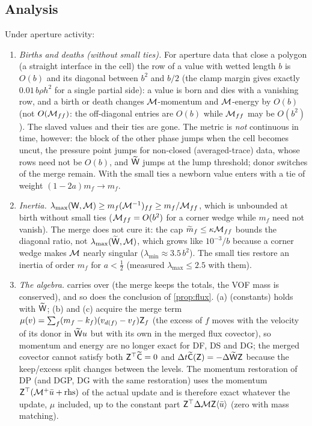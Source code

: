 \subsection{Analysis}\label{sec:ap:analysis}
\begin{proposition}\label{prop:aperture}
Under aperture activity:
\begin{enumerate}[leftmargin=*,itemsep=1pt,label=(\alph*)]
\item \emph{Births and deaths (without small ties).}  For aperture data that close a polygon
  (a straight interface in the cell) the row of a value with wetted length $b$ is $O(b)$ and
  its diagonal between $b^2$ and $b/2$ (the clamp margin gives exactly $0.01\,b\rho h^2$ for a
  single partial side): a value is born and dies with a vanishing row, and a birth or death
  changes $\mathcal M$-momentum and $\mathcal M$-energy by $O(b)$ (not $O(\mathcal M_{ff})$: the off-diagonal
  entries are $O(b)$ while $\mathcal M_{ff}$ may be $O(b^2)$).  The slaved values and their ties are
  gone.  The metric is \emph{not} continuous in time, however: the block of the other phase
  jumps when the cell becomes uncut, the pressure point jumps for non-closed (averaged-trace)
  data, whose rows need not be $O(b)$, and $\widetilde{\mathsf W}$ jumps at the lump threshold; donor
  switches of the merge remain.  With the small ties a newborn value enters with a tie of
  weight $(1-2a)m_f\to m_f$.
\item \emph{Inertia.}  $\lambda_{\max}(\mathsf W,\mathcal M)\ge m_f(\mathcal M^{-1})_{ff}\ge m_f/\mathcal M_{ff}$, which is
  unbounded at birth without small ties ($\mathcal M_{ff}=O(b^2)$ for a corner wedge while $m_f$ need
  not vanish).  The merge does not cure it: the cap $\widetilde m_f\le\kappa\mathcal M_{ff}$ bounds the
  diagonal ratio, not $\lambda_{\max}(\widetilde{\mathsf W},\mathcal M)$, which grows like $10^{-3}/b$ because a
  corner wedge makes $\mathcal M$ nearly singular ($\lambda_{\min}\approx3.5\,b^2$).  The small ties
  restore an inertia of order $m_f$ for $a<\tfrac12$ (measured $\lambda_{\max}\le2.5$ with them).
\item \emph{The algebra.}   carries over (the merge keeps the totals,
  the VOF mass is conserved), and so does the conclusion of \cref{prop:flux}.  (a)
  (constants) holds with $\widetilde{\mathsf W}$; (b) and (c) acquire the merge term
  $\mu(v)=\sum_f(m_f-k_f)(v_{d(f)}-v_f)\mathsf Z_f$ (the excess of $f$ moves with the velocity of its donor
  in $\widetilde{\mathsf W} u$ but with its own in the merged flux covector), so momentum and energy are
  no longer exact for DF, DS and DG; the merged covector cannot satisfy both
  $\mathsf Z^\top\widetilde{\mathsf C}=0$ and $\Delta t\widetilde{\mathsf C}(\mathsf Z)=-\Delta\widetilde{\mathsf W}\mathsf Z$ because the keep/excess split
  changes between the levels.  The momentum restoration of DP (and DGP, DG with the same
  restoration) uses the momentum $\mathsf Z^\top(\mathcal M^+\bar u+\text{rhs})$ of the actual update and is
  therefore exact whatever the update, $\mu$ included, up to the constant part
  $\mathsf Z^\top\Delta\mathcal M\mathsf Z\langle\bar u\rangle$ (zero with mass matching).
\end{enumerate}
\end{proposition}
